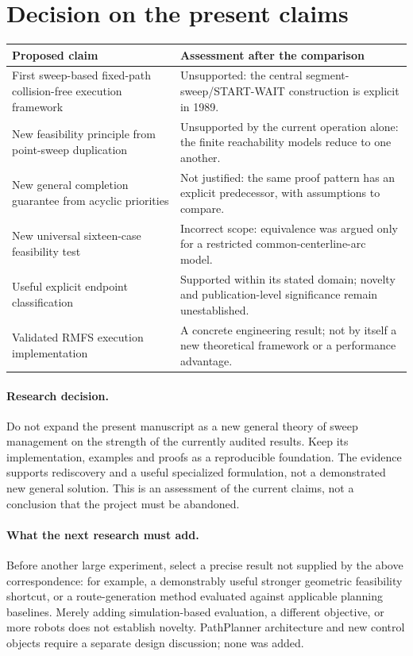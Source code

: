 \documentclass[11pt,a4paper]{article}
\begin{document}
\section{Decision on the present claims}
\begin{center}\small
\begin{tabular}{p{60mm}p{80mm}}\toprule
Proposed claim & Assessment after the comparison\\\midrule
First sweep-based fixed-path collision-free execution framework & Unsupported:
the central segment-sweep/START-WAIT construction is explicit in 1989.\\
New feasibility principle from point-sweep duplication & Unsupported by the
current operation alone: the finite reachability models reduce to one another.\\
New general completion guarantee from acyclic priorities & Not justified:
the same proof pattern has an explicit predecessor, with assumptions to compare.\\
New universal sixteen-case feasibility test & Incorrect scope: equivalence
was argued only for a restricted common-centerline-arc model.\\
Useful explicit endpoint classification & Supported within its stated domain;
novelty and publication-level significance remain unestablished.\\
Validated RMFS execution implementation & A concrete engineering result;
not by itself a new theoretical framework or a performance advantage.\\\bottomrule
\end{tabular}
\end{center}

\paragraph{Research decision.}
Do not expand the present manuscript as a new general theory of sweep management
on the strength of the currently audited results. Keep its implementation,
examples and proofs as a reproducible foundation. The evidence supports
rediscovery and a useful specialized formulation, not a demonstrated new
general solution. This is an assessment of the current claims, not a conclusion
that the project must be abandoned.

\paragraph{What the next research must add.}
Before another large experiment, select a precise result not supplied by the
above correspondence: for example, a demonstrably useful stronger geometric
feasibility shortcut, or a route-generation method evaluated against applicable
planning baselines. Merely adding simulation-based evaluation, a different
objective, or more robots does not establish novelty. PathPlanner architecture
and new control objects require a separate design discussion; none was added.
\end{document}
